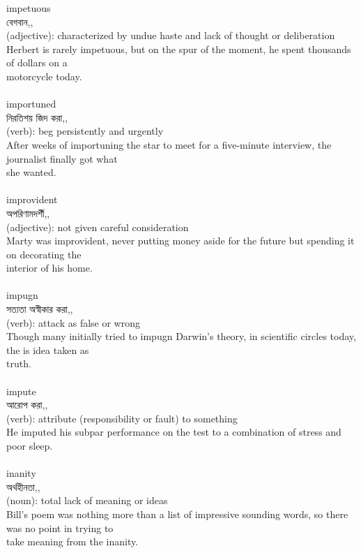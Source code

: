 \documentclass{article}
\begin{document}
{{impetuous}\\
{বেগবান,,}\\
{(adjective): characterized by undue haste and lack of thought or deliberation\\Herbert is rarely impetuous, but on the spur of the moment, he spent thousands of dollars on a\\motorcycle today.\\}\\
{importuned}\\
{নিরতিশয় জিদ করা,,}\\
{(verb): beg persistently and urgently\\After weeks of importuning the star to meet for a five-minute interview, the journalist finally got what\\she wanted.\\}\\
{improvident}\\
{অপরিণামদর্শী,,}\\
{(adjective): not given careful consideration\\Marty was improvident, never putting money aside for the future but spending it on decorating the\\interior of his home.\\}\\
{impugn}\\
{সত্যতা অস্বীকার করা,,}\\
{(verb): attack as false or wrong\\Though many initially tried to impugn Darwin's theory, in scientific circles today, the is idea taken as\\truth.\\}\\
{impute}\\
{আরোপ করা,,}\\
{(verb): attribute (responsibility or fault) to something\\He imputed his subpar performance on the test to a combination of stress and poor sleep.\\}\\
{inanity}\\
{অর্থহীনতা,,}\\
{(noun): total lack of meaning or ideas\\Bill's poem was nothing more than a list of impressive sounding words, so there was no point in trying to\\take meaning from the inanity.\\}\\
}
\end{document}
